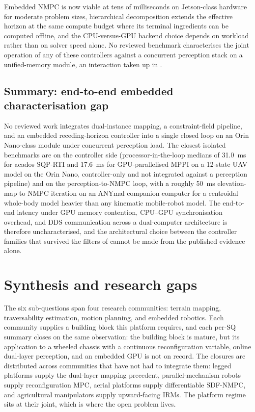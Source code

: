 \documentclass[11pt,a4paper]{article}
\begin{document}
Embedded NMPC is now viable at tens of milliseconds on Jetson-class hardware for moderate problem sizes, hierarchical decomposition extends the effective horizon at the same compute budget where its terminal ingredients can be computed offline, and the CPU-versus-GPU backend choice depends on workload rather than on solver speed alone. No reviewed benchmark characterises the joint operation of any of these controllers against a concurrent perception stack on a unified-memory module, an interaction taken up in .

\subsection{Summary: end-to-end embedded characterisation gap}
\label{sec:sq6:discussion}
No reviewed work integrates dual-instance mapping, a constraint-field pipeline, and an embedded receding-horizon controller into a single closed loop on an Orin Nano-class module under concurrent perception load. The closest isolated benchmarks are \citet{enrico2025nmpcmppi} on the controller side (processor-in-the-loop medians of \SI{31.0}{\milli\second} for acados SQP-RTI and \SI{17.6}{\milli\second} for GPU-parallelised MPPI on a 12-state UAV model on the Orin Nano, controller-only and not integrated against a perception pipeline) and \citet{grandiaPerceptiveLocomotionNonlinear2022} on the perception-to-NMPC loop, with a roughly \SI{50}{\milli\second} elevation-map-to-NMPC iteration on an ANYmal companion computer for a centroidal whole-body model heavier than any kinematic mobile-robot model. The end-to-end latency under GPU memory contention, CPU--GPU synchronisation overhead, and DDS communication across a dual-computer architecture is therefore uncharacterised, and the architectural choice between the controller families that survived the filters of  cannot be made from the published evidence alone.

\section{Synthesis and research gaps}
\label{sec:synthesis}

The six sub-questions span four research communities: terrain mapping, traversability estimation, motion planning, and embedded robotics. Each community supplies a building block this platform requires, and each per-SQ summary closes on the same observation: the building block is mature, but its application to a wheeled chassis with a continuous reconfiguration variable, online dual-layer perception, and an embedded GPU is not on record. The closures are distributed across communities that have not had to integrate them: legged platforms supply the dual-layer mapping precedent, parallel-mechanism robots supply reconfiguration MPC, aerial platforms supply differentiable SDF-NMPC, and agricultural manipulators supply upward-facing IRMs. The platform regime sits at their joint, which is where the open problem lives.
\end{document}
